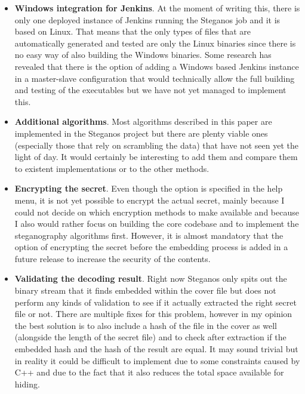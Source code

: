 \begin{itemize}
	\item \textbf{Windows integration for Jenkins}. At the moment of writing this, there is only one deployed instance of Jenkins running the Steganos job and it is based on Linux. That means that the only types of files that are automatically generated and tested are only the Linux binaries since there is no easy way of also building the Windows binaries. Some research has revealed that there is the option of adding a Windows based Jenkins instance in a master-slave configuration that would technically allow the full building and testing of the executables but we have not yet managed to implement this. 
	\item \textbf{Additional algorithms}. Most algorithms described in this paper are implemented in the Steganos project but there are plenty viable ones (especially those that rely on scrambling the data) that have not seen yet the light of day. It would certainly be interesting to add them and compare them to existent implementations or to the other methods.
	\item \textbf{Encrypting the secret}. Even though the option is specified in the help menu, it is not yet possible to encrypt the actual secret, mainly because I could not decide on which encryption methods to make available and because I also would rather focus on building the core codebase and to implement the steganography algorithms first. However, it is almost mandatory that the option of encrypting the secret before the embedding process is added in a future release to increase the security of the contents.
	\item \textbf{Validating the decoding result}. Right now Steganos only spits out the binary stream that it finds embedded within the cover file but does not perform any kinds of validation to see if it actually extracted the right secret file or not. There are multiple fixes for this problem, however in my opinion the best solution is to also include a hash of the file in the cover as well (alongside the length of the secret file) and to check after extraction if the embedded hash and the hash of the result are equal. It may sound trivial but in reality it could be difficult to implement due to some constraints caused by C++ and due to the fact that it also reduces the total space available for hiding.
\end{itemize}